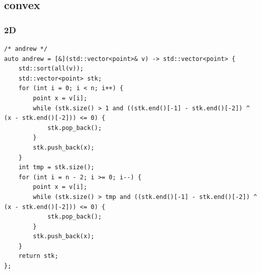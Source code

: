 \documentclass[UTF8, a4paper, titlepage, twoside]{ctexart}
\begin{document}
\subsection{ convex }
\subsubsection*{ 2D }
\begin{lstlisting}[style=cpp]
/* andrew */
auto andrew = [&](std::vector<point>& v) -> std::vector<point> {
    std::sort(all(v));
    std::vector<point> stk;
    for (int i = 0; i < n; i++) {
        point x = v[i];
        while (stk.size() > 1 and ((stk.end()[-1] - stk.end()[-2]) ^ (x - stk.end()[-2])) <= 0) {
            stk.pop_back();
        }
        stk.push_back(x);
    }
    int tmp = stk.size();
    for (int i = n - 2; i >= 0; i--) {
        point x = v[i];
        while (stk.size() > tmp and ((stk.end()[-1] - stk.end()[-2]) ^ (x - stk.end()[-2])) <= 0) {
            stk.pop_back();
        }
        stk.push_back(x);
    }
    return stk;
};
\end{lstlisting}
\end{document}
